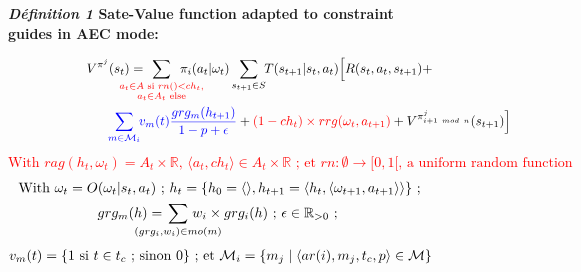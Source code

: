 \documentclass[pdflatex,sn-mathphys-num]{sn-jnl}%
\theoremstyle{thmstyleone}%
\theoremstyle{thmstyletwo}%
\theoremstyle{thmstylethree}%
\begin{document}
\begin{figure}[t]

    \label{eq:single_value_function}
    \raggedright
    \textbf{\textit{Définition 1} \quad Sate-Value function adapted to constraint guides in AEC mode:}

    \begin{scriptsize}
      \vspace{-0.3cm}
      \begin{gather*}
      V^{\pi^j}(s_t) = \hspace{-0.75cm} \sum_{\textcolor{red}{ \substack{a_{t} \in A \text{ si } rn() < ch_{t}, \\ 
      a_{t} \in A_{t} \text{ else}}
      }}{\hspace{-0.7cm} \pi_i(a_{t} | \omega_t)} \sum_{s_{t+1} \in S}\hspace{-0.1cm} T(s_{t+1} | s_t, a_{t})\Bigl[R(s_t,a_{t},s_{t+1}) + \\
      \hspace{2.7cm}\textcolor{blue}{ \sum_{m \in \mathcal{M}_i}{ \hspace{-0.1cm} v_m(t) \frac{grg_m(h_{t+1})}{1 - p + \epsilon} } } + \textcolor{red}{(1-ch_t) \times rrg(\omega_t,a_{t+1})} + V^{\pi^j_{i+1 \ mod \ n}}(s_{t+1})\Bigr]
    \end{gather*}  
    \vspace{-0.3cm}
    \textcolor{red}{$\hspace{0cm}\text{With } rag(h_t, \omega_t) = A_{t} \times \mathbb{R} \text{, } \langle a_t, ch_{t} \rangle \in A_{t} \times \mathbb{R} \text{ ; et } rn: \emptyset \to [0,1[ \text{, a uniform random function}$}
    \vspace{-0cm}
    \textcolor{blue}{
    \begin{gather*}
    \hspace{0.1cm}{\text{With } \omega_t = O(\omega_t | s_t, a_t) \text{ ; } h_t = \{h_0 = \langle \rangle, h_{t+1} = \langle h_t, \langle \omega_{t+1}, a_{t+1} \rangle \rangle \} \text{ ; }} \\
    {grg_m(h) = \hspace{-0.8cm} \sum_{(grg_i,w_i) \in mo(m)}{\hspace{-0.8cm} w_i \times grg_i(h)} \text{ ; } \epsilon \in \mathbb{R}_{>0} \text{ ; }}
    \end{gather*}
    }
    \vspace{-1.05cm}
    \textcolor{blue}{
    \begin{gather*}
    \hspace{-0cm}
    v_m(t) = \{ 1 \text{ si } t \in t_c \text{ ; sinon } 0 \} \text{ ; et } \mathcal{M}_i = \{m_j \mid \langle ar(i),m_j,t_c,p \rangle \in \mathcal{M}\}
    \end{gather*}
    }
    \vspace{-0.6cm}

    \end{scriptsize}

\end{figure}
\end{document}
